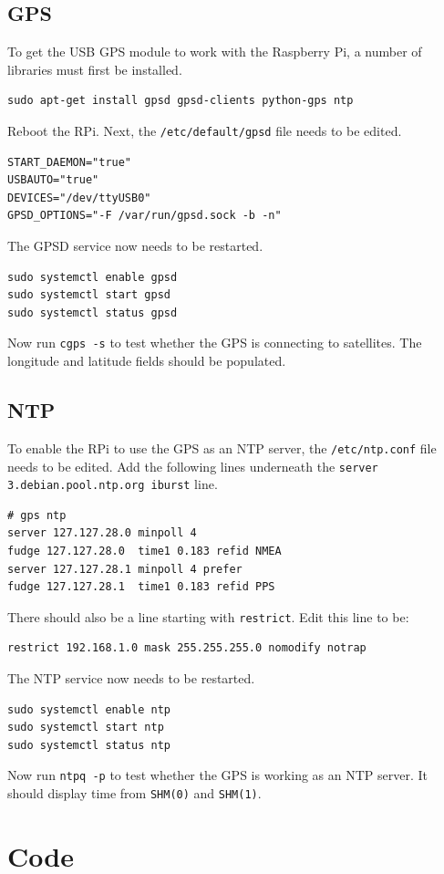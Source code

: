 \documentclass[11pt]{report}
\begin{document}
\section{GPS}

To get the USB GPS module to work with the Raspberry Pi, a number of libraries must first be installed.
\begin{lstlisting}
sudo apt-get install gpsd gpsd-clients python-gps ntp
\end{lstlisting}
Reboot the RPi. Next, the \texttt{/etc/default/gpsd} file needs to be edited.
\begin{lstlisting}
START_DAEMON="true"
USBAUTO="true"
DEVICES="/dev/ttyUSB0"
GPSD_OPTIONS="-F /var/run/gpsd.sock -b -n"
\end{lstlisting}
The GPSD service now needs to be restarted.
\begin{lstlisting}
sudo systemctl enable gpsd
sudo systemctl start gpsd
sudo systemctl status gpsd
\end{lstlisting}
Now run \texttt{cgps -s} to test whether the GPS is connecting to satellites. The longitude and latitude fields should be populated.

\section{NTP}

To enable the RPi to use the GPS as an NTP server, the \texttt{/etc/ntp.conf} file needs to be edited. Add the following lines underneath the \texttt{server 3.debian.pool.ntp.org iburst} line.
\begin{lstlisting}
# gps ntp
server 127.127.28.0 minpoll 4
fudge 127.127.28.0  time1 0.183 refid NMEA
server 127.127.28.1 minpoll 4 prefer
fudge 127.127.28.1  time1 0.183 refid PPS
\end{lstlisting}
There should also be a line starting with \texttt{restrict}. Edit this line to be:
\begin{lstlisting}
restrict 192.168.1.0 mask 255.255.255.0 nomodify notrap
\end{lstlisting}
The NTP service now needs to be restarted.
\begin{lstlisting}
sudo systemctl enable ntp
sudo systemctl start ntp
sudo systemctl status ntp
\end{lstlisting}
Now run \texttt{ntpq -p} to test whether the GPS is working as an NTP server. It should display time from \texttt{SHM(0)} and \texttt{SHM(1)}.


\chapter{Code}
\end{document}
